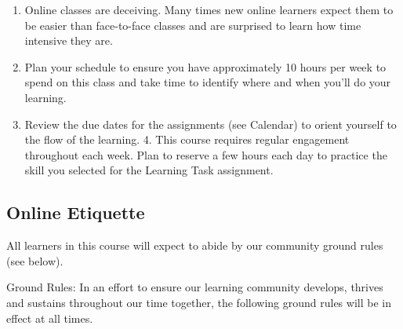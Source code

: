 \documentclass[
  letterpaper,
  DIV=11,
  numbers=noendperiod,
  oneside]{scrartcl}
\providecommand{\tightlist}{%
  \setlength{\itemsep}{0pt}\setlength{\parskip}{0pt}}\usepackage{longtable,booktabs,array}
\begin{document}
\begin{enumerate}
\def\labelenumi{\arabic{enumi}.}
\tightlist
\item
  Online classes are deceiving. Many times new online learners expect
  them to be easier than face-to-face classes and are surprised to learn
  how time intensive they are.
\item
  Plan your schedule to ensure you have approximately 10 hours per week
  to spend on this class and take time to identify where and when you'll
  do your learning.
\item
  Review the due dates for the assignments (see Calendar) to orient
  yourself to the flow of the learning. 4. This course requires regular
  engagement throughout each week. Plan to reserve a few hours each day
  to practice the skill you selected for the Learning Task assignment.
\end{enumerate}

\hypertarget{online-etiquette}{%
\subsection{Online Etiquette}\label{online-etiquette}}

All learners in this course will expect to abide by our community ground
rules (see below).

Ground Rules: In an effort to ensure our learning community develops,
thrives and sustains throughout our time together, the following ground
rules will be in effect at all times.
\end{document}
